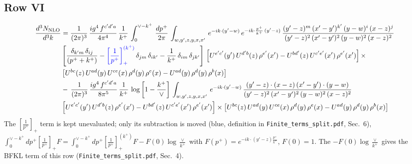 \documentclass[9pt]{article}
\newcommand{\new}[1]{{\color{blue}#1}}
\numberwithin{equation}{section}
\begin{document}
\subsection{Row VI}
\begin{align}
    \frac{d^{3}N_{\rm NLO}}{d^{3}k} & = \frac{1}{(2\pi)^{3}}\, \frac{ig^{4}\,f^{c'd'a}}{4\pi^{4}}\, \frac{1}{k^{+}}\,\int_{0}^{\vee-k^{+}}\, \frac{dp^{+}}{2\pi}\, \int_{w,y',z,y,x,x'}\, e^{-ik\cdot (y'-w)}\, e^{-ik\cdot \frac{p^{+}}{k^{+}}\,(y'-z)}\,\frac{(y'-z)^{m}\,(x'-y')^{k'}\,(y-w)^{i}\,(x-z)^{j}}{(y'-z)^{2}\,(x'-y')^{2}\,(y-w)^{2}\,(x-z)^{2}}\notag \\ & \left[\frac{\delta_{k'm}\,\delta_{ij}}{(p^{+}+k^{+})}-\new{\left[\frac{1}{p^{+}}\right]_{+}^{(k^{+})}}\,\delta_{jm}\,\delta_{ik'}-\frac{1}{k^{+}}\, \delta_{im}\, \delta_{jk'}\right]\, \left[U^{e'c'}(y')\,U^{d'b}(z)\,\rho^{e'}(x')-U^{bd'}(z)\,U^{c'e'}(x')\,\rho^{e'}(x')\right]\times\notag \\ &  \left[U^{bc}(z)\,U^{ad}(y)\,U^{ce}(x)\,\rho^{d}(y)\,\rho^{e}(x)-U^{ad}(y)\,\rho^{d}(y)\,\rho^{b}(x)\right]\notag \\ &  -\,\frac{1}{(2\pi)^{3}}\, \frac{ig^{4}\,f^{c'd'a}}{8\pi^{5}}\, \frac{1}{k^{+}}\, \log{\left[1-\frac{k^{+}}{\vee}\right]}\, \int_{w,y',z,y,x,x'}\, e^{-ik\cdot (y'-w)}\,\frac{(y'-z)\cdot (x-z)\,(x'-y')\cdot (y-w)}{(y'-z)^{2}\,(x'-y')^{2}\,(y-w)^{2}\,(x-z)^{2}}\notag \\ & \left[U^{e'c'}(y')\,U^{d'b}(z)\,\rho^{e'}(x')-U^{bd'}(z)\,U^{c'e'}(x')\,\rho^{e'}(x')\right]\times  \left[U^{bc}(z)\,U^{ad}(y)\,U^{ce}(x)\,\rho^{d}(y)\,\rho^{e}(x)-U^{ad}(y)\,\rho^{d}(y)\,\rho^{b}(x)\right]
\end{align}
\new{The $\left[\frac{1}{p^+}\right]_+$ term is kept unevaluated; only its subtraction is moved (blue, definition in \texttt{Finite\_terms\_split.pdf}, Sec.~6), $\int_0^{\vee-k^+}dp^+\left[\frac{1}{p^+}\right]_+F=\int_0^{\vee-k^+}dp^+\left[\frac{1}{p^+}\right]_+^{(k^+)}F-F(0)\log\frac{\vee}{k^+}$ with $F(p^+)=e^{-ik\cdot(y'-z)\frac{p^+}{k^+}}$, $F(0)=1$. The $-F(0)\log\frac{\vee}{k^+}$ gives the BFKL term of this row (\texttt{Finite\_terms\_split.pdf}, Sec.~4).}
\end{document}

